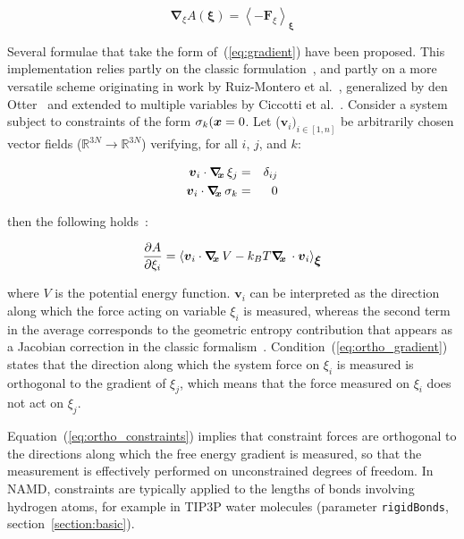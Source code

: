 \begin{equation}
  \label{eq:gradient}
  \bm{\nabla}_\xi A(\bm{\xi}) = \left\langle -\bm{F}_\xi \right\rangle_\bm{\xi}
\end{equation}

Several formulae that take the form of~(\ref{eq:gradient}) have been proposed.
This implementation relies partly on the classic formulation~\cite{Carter1989},
and partly on a more versatile scheme originating in work by Ruiz-Montero et
al.~\cite{Ruiz-Montero1997}, generalized by den Otter~\cite{denOtter2000} and
extended to multiple variables by Ciccotti et al.~\cite{Ciccotti2005}.
Consider a system subject to constraints of the form $\sigma_k(\vx) = 0$.
Let ($\bm{v}_i)_{i\in[1,n]}$ be arbitrarily chosen vector fields
($\mathbb{R}^{3N}\rightarrow\mathbb{R}^{3N}$) verifying, for all $i$, $j$,
and $k$:

\begin{eqnarray}
\label{eq:ortho_gradient}
\bm{v}_i \cdot \gradx \xi_j    & = & \delta_{ij}\\
\label{eq:ortho_constraints}
\bm{v}_i \cdot \gradx \sigma_k & = & 0
\end{eqnarray}

then the following holds~\cite{Ciccotti2005}:

\begin{equation}
\label{eq:gradient_vector}
\frac{\partial A}{\partial \xi_i} = \left\langle \bm{v}_i \cdot \gradx V
- k_B T \gradx \cdot \bm{v}_i \right\rangle_\bm{\xi}
\end{equation}

where $V$ is the potential energy function.
$\bm{v}_i$ can be interpreted as the direction along which the force
acting on variable $\xi_i$ is measured, whereas the second term in the
average corresponds to the geometric entropy contribution that appears
as a Jacobian correction in the classic formalism~\cite{Carter1989}.
Condition~(\ref{eq:ortho_gradient}) states that the direction along
which the system force on $\xi_i$ is measured is orthogonal to the
gradient of $\xi_j$, which means that the force measured on $\xi_i$
does not act on $\xi_j$.

Equation~(\ref{eq:ortho_constraints}) implies that constraint forces
are orthogonal to the directions along which the free energy gradient is
measured, so that the measurement is effectively performed on unconstrained
degrees of freedom. In NAMD, constraints are typically applied to the lengths of
bonds involving hydrogen atoms, for example in TIP3P water molecules
(parameter \texttt{rigidBonds}, section~\ref{section:basic}).


